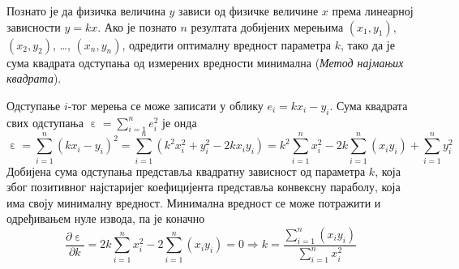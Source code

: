 \PID \label{z:mnk_1}
Познато је да физичка величина $y$ зависи од физичке величине $x$ према линеарној 
зависности $y = kx$. Ако је познато $n$ резултата добијених мерењима $(x_1, y_1)$, 
$(x_2, y_2)$, \ldots, 
$(x_n, y_n)$, одредити оптималну вредност параметра $k$, тако да је сума квадрата одступања
од измерених вредности минимална (\textit{Метод најмањих квадрата}).

\RESENJE

Одступање $i$-тог мерења се може записати у облику $e_i = kx_i - y_i$. Сума квадрата свих одступања 
$\upepsilon = \sum_{i = 1}^n e_i^2$ је 
онда 
\begin{equation}
    \upepsilon = \sum_{i = 1}^n (kx_i - y_i)^2  
    = \sum_{i = 1}^n (k^2 x_i^2 + y_i^2 - 2 k x_i y_i)
    = k^2 \sum_{i = 1}^n x_i^2 - 2 k \sum_{i = 1}^n (x_i y_i) + \sum_{i = 1}^n y_i^2
\end{equation}
Добијена сума одступања представља квадратну зависност од параметра $k$, која због позитивног најстаријег коефицијента
представља конвексну параболу, која има своју минималну вредност. Минимална вредност се може потражити и одређивањем нуле извода, па је
коначно 
\begin{equation}
    \dfrac{\partial  \upepsilon  }{\partial k} =
    2 k \sum_{i = 1}^n x_i^2 - 2 \sum_{i = 1}^n (x_i y_i) = 0 
    \Rightarrow
    k = \dfrac{\displaystyle \sum_{i = 1}^n (x_i y_i) }{\displaystyle \sum_{i = 1}^n x_i^2} \label{eq:mnk_1:rezultat}
\end{equation}
